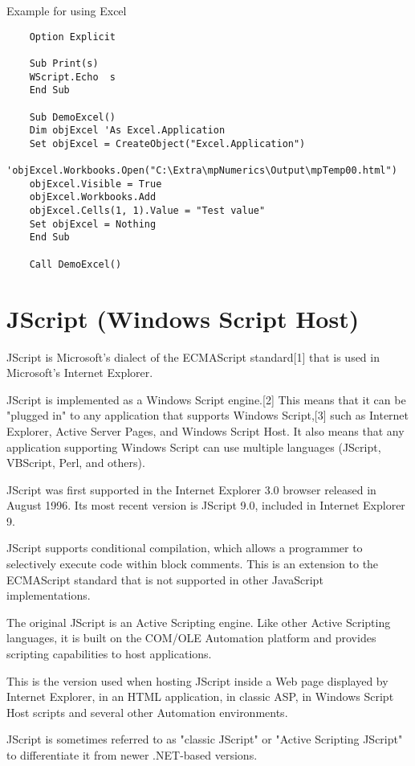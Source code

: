 	
	\vpara
	Example for using Excel
	
	\begin{lstlisting}
	Option Explicit
	
	Sub Print(s)
	WScript.Echo  s
	End Sub
	
	Sub DemoExcel()
	Dim objExcel 'As Excel.Application
	Set objExcel = CreateObject("Excel.Application")
	'objExcel.Workbooks.Open("C:\Extra\mpNumerics\Output\mpTemp00.html")
	objExcel.Visible = True
	objExcel.Workbooks.Add
	objExcel.Cells(1, 1).Value = "Test value"
	Set objExcel = Nothing
	End Sub
	
	Call DemoExcel()
	\end{lstlisting}
	
	
	
	
	\newpage
	\section{JScript (Windows Script Host)}
	JScript is Microsoft's dialect of the ECMAScript standard[1] that is used in Microsoft's Internet Explorer.
	
	\vpara
	JScript is implemented as a Windows Script engine.[2] This means that it can be "plugged in" to any application that supports Windows Script,[3] such as Internet Explorer, Active Server Pages, and Windows Script Host. It also means that any application supporting Windows Script can use multiple languages (JScript, VBScript, Perl, and others).
	
	\vpara
	JScript was first supported in the Internet Explorer 3.0 browser released in August 1996. Its most recent version is JScript 9.0, included in Internet Explorer 9.
	
	\vpara
	JScript supports conditional compilation, which allows a programmer to selectively execute code within block comments. This is an extension to the ECMAScript standard that is not supported in other JavaScript implementations.
	
	\vpara
	The original JScript is an Active Scripting engine. Like other Active Scripting languages, it is built on the COM/OLE Automation platform and provides scripting capabilities to host applications.
	
	\vpara
	This is the version used when hosting JScript inside a Web page displayed by Internet Explorer, in an HTML application, in classic ASP, in Windows Script Host scripts and several other Automation environments.
	
	\vpara
	JScript is sometimes referred to as "classic JScript" or "Active Scripting JScript" to differentiate it from newer .NET-based versions.
	
